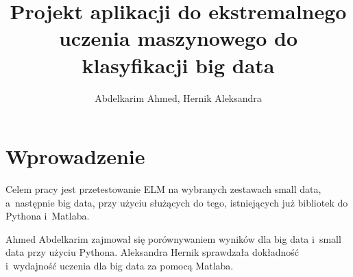 \documentclass{article}
\title{Projekt aplikacji do ekstremalnego uczenia maszynowego do klasyfikacji big data}
\author{Abdelkarim Ahmed, Hernik Aleksandra}
\date{}
\begin{document}
\renewcommand*\listfigurename{Wykaz rysunków}
\renewcommand*\listtablename{Wykaz tabel}
\clearpage
\vspace*{\fill}
\begin{center}
\begin{minipage}{.9\textwidth}
\maketitle
\end{minipage}
\end{center}
\vfill
\clearpage

\tableofcontents
\clearpage

\section*{Wprowadzenie}
Celem pracy jest przetestowanie ELM na wybranych zestawach small data, a~następnie big data, przy użyciu służących do tego, istniejących już bibliotek do Pythona i~Matlaba.

Ahmed Abdelkarim zajmował się porównywaniem wyników dla big data i~small data przy użyciu Pythona.
Aleksandra Hernik sprawdzała dokładność i~wydajność uczenia dla big data za pomocą Matlaba.

\clearpage
\end{document}
